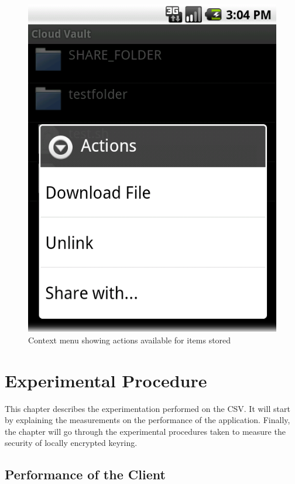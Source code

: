 \documentclass[pdftex,english,10pt,b5paper,twoside]{book}
\begin{document}
\begin{figure}[h!]
    \centering
    \includegraphics[scale=0.4]{client-browsecontext.png}
    \caption{Context menu showing actions available for items stored}
    \label{fig:CSVAndroid:remotecontext}
\end{figure}

\chapter{Experimental Procedure}
\label{ch:experimental}

This chapter describes the experimentation performed on the \acl{CSV}. It will
start by explaining the measurements on the performance of the application.
Finally, the chapter will go through the experimental procedures taken to
measure the security of locally encrypted keyring.

\section{Performance of the Client}
\end{document}
